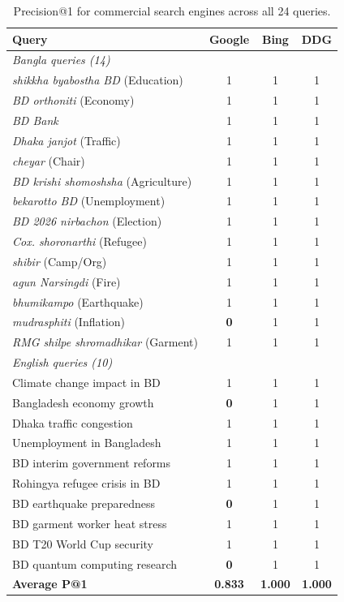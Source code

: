 \documentclass[12pt,a4paper]{article}
\newcommand{\bn}[1]{\textit{#1}}
\begin{document}
\begin{table}[H]
\centering
\caption{Precision@1 for commercial search engines across all 24 queries.}
\label{tab:search_engine_comparison}
\begin{tabular}{lccc}
\toprule
\textbf{Query} & \textbf{Google} & \textbf{Bing} & \textbf{DDG} \\
\midrule
\multicolumn{4}{l}{\textit{Bangla queries (14)}} \\
\bn{shikkha byabostha BD} (Education)       & 1 & 1 & 1 \\
\bn{BD orthoniti} (Economy)                  & 1 & 1 & 1 \\
\bn{BD Bank}                                 & 1 & 1 & 1 \\
\bn{Dhaka janjot} (Traffic)                  & 1 & 1 & 1 \\
\bn{cheyar} (Chair)                          & 1 & 1 & 1 \\
\bn{BD krishi shomoshsha} (Agriculture)      & 1 & 1 & 1 \\
\bn{bekarotto BD} (Unemployment)             & 1 & 1 & 1 \\
\bn{BD 2026 nirbachon} (Election)            & 1 & 1 & 1 \\
\bn{Cox. shoronarthi} (Refugee)              & 1 & 1 & 1 \\
\bn{shibir} (Camp/Org)                       & 1 & 1 & 1 \\
\bn{agun Narsingdi} (Fire)                   & 1 & 1 & 1 \\
\bn{bhumikampo} (Earthquake)                 & 1 & 1 & 1 \\
\bn{mudrasphiti} (Inflation)                 & \textbf{0} & 1 & 1 \\
\bn{RMG shilpe shromadhikar} (Garment)       & 1 & 1 & 1 \\
\midrule
\multicolumn{4}{l}{\textit{English queries (10)}} \\
Climate change impact in BD                  & 1 & 1 & 1 \\
Bangladesh economy growth                    & \textbf{0} & 1 & 1 \\
Dhaka traffic congestion                     & 1 & 1 & 1 \\
Unemployment in Bangladesh                   & 1 & 1 & 1 \\
BD interim government reforms                & 1 & 1 & 1 \\
Rohingya refugee crisis in BD                & 1 & 1 & 1 \\
BD earthquake preparedness                   & \textbf{0} & 1 & 1 \\
BD garment worker heat stress                & 1 & 1 & 1 \\
BD T20 World Cup security                    & 1 & 1 & 1 \\
BD quantum computing research                & \textbf{0} & 1 & 1 \\
\midrule
\textbf{Average P@1}                         & \textbf{0.833} & \textbf{1.000} & \textbf{1.000} \\
\bottomrule
\end{tabular}
\end{table}
\end{document}
